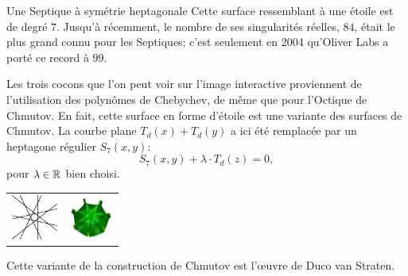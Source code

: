 \begin{surferPage}[7-gon]{Une Septique à symétrie heptagonale}
    Cette surface ressemblant à une étoile est de degré $7$.
    Jusqu'à récemment, le nombre de ses singularités réelles, $84$,
    était le plus grand connu pour les Septiques;
    c'est seulement en 2004 qu'Oliver Labs a porté ce record à $99$.
  
  
 Les trois cocons que l'on peut voir sur l'image interactive 
    proviennent de l'utilisation des polynômes de Chebychev, de même que pour l'Octique de Chmutov.
    En fait, cette surface en forme d'étoile est une variante des surfaces de Chmutov.
    La courbe plane $T_d(x)+T_d(y)$ a ici été remplacée par un heptagone régulier
    $S_7(x,y)$: 
   \[S_7(x,y) + \lambda \cdot T_d(z) = 0,\]
    pour $\lambda\in{\mathbb R}$ bien choisi. 
    \vspace*{-0.3em}
    \begin{center}
      \begin{tabular}{c@{\qquad}c}
        \includegraphics[height=1.5cm]{./../../common/images/labsseptic1.pdf}
        &
        \includegraphics[height=1.5cm]{./../../common/images/septic_7eck_von_oben}
      \end{tabular}
    \end{center}
    \vspace*{-0.3em}   
   Cette variante de la construction de Chmutov est l'œuvre de Duco van Straten.
\end{surferPage}
